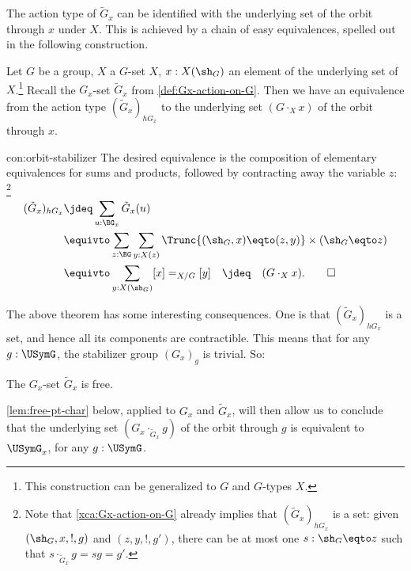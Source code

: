 The action type of $\tilde G_x$ can be identified with the 
underlying set of the orbit through $x$ under $X$. This is 
achieved by a chain of easy equivalences, spelled
out in the following construction.

\begin{construction}
  \label{con:orbit-stabilizer}
  Let $G$ be a group, $X$ a $G$-set $X$,
  $x : X(\sh_G)$ an element of the underlying set of $X$.\footnote{%
  This construction can be generalized to \inftygps $G$ and $G$-types $X$.}
  Recall the $G_x$-set $\tilde G_x$ from \cref{def:Gx-action-on-G}.
  Then we have an equivalence from the action type $(\tilde G_x)_{hG_x}$
  to the underlying set $(G\cdot_X x)$ of the orbit through $x$.
\end{construction}
\begin{implementation}{con:orbit-stabilizer}
  The desired equivalence is the composition of elementary equivalences
  for sums and products, followed by contracting away the variable $z$:
\footnote{\label{ft:action-type-tildeGx-set} 
Note that \cref{xca:Gx-action-on-G} already
implies that $(\tilde G_x)_{hG_x}$ is a set:
given $(\sh_G,x,!,g)$ and $(z,y,!,g')$, there can be at most
one $s : \sh_G \eqto z$ such that $s\cdot_{\tilde G_x} g = sg = g'$. 
}
  \begin{align*}
    (\tilde G_x)_{hG_x}
    &\jdeq \sum_{u : \BG_x}\tilde G_x(u) \\
    &\equivto \sum_{z:\BG}\sum_{y:X(z)}
    \Trunc{(\sh_G,x) \eqto (z,y)}\times (\sh_G \eqto z) \\
    &\equivto \sum_{y:X(\sh_G)}[x] =_{X/G} [y]\quad\jdeq\quad(G\cdot_X x).\qedhere
  \end{align*}
\end{implementation}

The above theorem has some interesting consequences.
One is that $(\tilde G_x)_{hG_x}$ is a set, 
and hence all its components are contractible.
This means that for any $g:\USymG$, the stabilizer group $(G_x)_g$
is trivial. So:

\begin{corollary}\label{cor:action-subgrp-free}
 The $G_x$-set $\tilde G_x$ is free.
\end{corollary}

\cref{lem:free-pt-char} below, applied to $G_x$ and $\tilde G_x$,
will then allow us to conclude that the underlying set 
$(G_x \cdot_{\tilde G_x} g)$ of the orbit through $g$ is equivalent to 
$\USymG_x$, for any $g:\USymG$.

